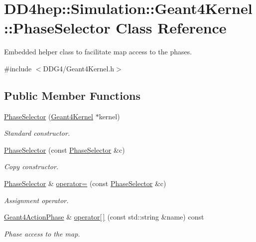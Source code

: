 \hypertarget{class_d_d4hep_1_1_simulation_1_1_geant4_kernel_1_1_phase_selector}{}\section{D\+D4hep\+:\+:Simulation\+:\+:Geant4\+Kernel\+:\+:Phase\+Selector Class Reference}
\label{class_d_d4hep_1_1_simulation_1_1_geant4_kernel_1_1_phase_selector}


Embedded helper class to facilitate map access to the phases.  




{\ttfamily \#include $<$D\+D\+G4/\+Geant4\+Kernel.\+h$>$}

\subsection*{Public Member Functions}
\begin{DoxyCompactItemize}
\item 
\hyperlink{class_d_d4hep_1_1_simulation_1_1_geant4_kernel_1_1_phase_selector_a3a641f53e3730efcff6eba4a42d509d1}{Phase\+Selector} (\hyperlink{class_d_d4hep_1_1_simulation_1_1_geant4_kernel}{Geant4\+Kernel} $\ast$kernel)
\begin{DoxyCompactList}\small\item\em Standard constructor. \end{DoxyCompactList}\item 
\hyperlink{class_d_d4hep_1_1_simulation_1_1_geant4_kernel_1_1_phase_selector_ab5629568686973076ca92c67f24351ee}{Phase\+Selector} (const \hyperlink{class_d_d4hep_1_1_simulation_1_1_geant4_kernel_1_1_phase_selector}{Phase\+Selector} \&c)
\begin{DoxyCompactList}\small\item\em Copy constructor. \end{DoxyCompactList}\item 
\hyperlink{class_d_d4hep_1_1_simulation_1_1_geant4_kernel_1_1_phase_selector}{Phase\+Selector} \& \hyperlink{class_d_d4hep_1_1_simulation_1_1_geant4_kernel_1_1_phase_selector_a6f83dcf657b82c81042ccdd9e994088d}{operator=} (const \hyperlink{class_d_d4hep_1_1_simulation_1_1_geant4_kernel_1_1_phase_selector}{Phase\+Selector} \&c)
\begin{DoxyCompactList}\small\item\em Assignment operator. \end{DoxyCompactList}\item 
\hyperlink{class_d_d4hep_1_1_simulation_1_1_geant4_action_phase}{Geant4\+Action\+Phase} \& \hyperlink{class_d_d4hep_1_1_simulation_1_1_geant4_kernel_1_1_phase_selector_a98b5fd806d172a46e001c0701a4f53c9}{operator\mbox{[}$\,$\mbox{]}} (const std\+::string \&name) const
\begin{DoxyCompactList}\small\item\em Phase access to the map. \end{DoxyCompactList}\end{DoxyCompactItemize}
